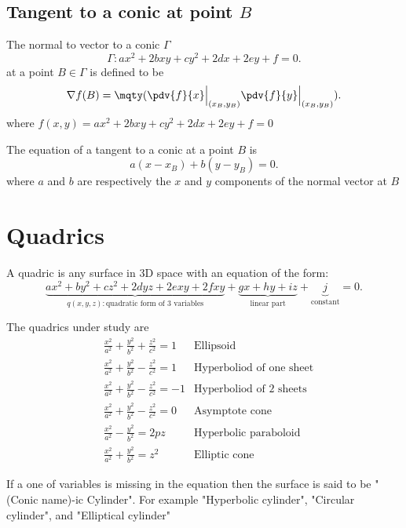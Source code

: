 \subsection{Tangent to a conic at point $B$ }
\begin{theorem}
	The normal to vector to a conic $\Gamma$
	\[
		\Gamma: ax^2+2bxy+cy^2+2dx+2ey+f=0
		.\]
	at a point $B\in\Gamma$ is defined to be
	\[
		\nabla  f(B) = \mqty(\pdv{f}{x} \Big|_{(x_B,y_B)}\\\pdv{f}{y} \Big|_{(x_B,y_B)})
		.\]
	where $f(x,y)=ax^2+2bxy+cy^2+2dx+2ey+f=0
	$
\end{theorem}

The equation of a tangent to a conic at a point $B$ is
\[
	a(x-x_B)+b(y-y_B)=0
	.\]
where $a$ and $b$ are respectively the $x$ and $y$ components of the normal vector at $B$


\section{Quadrics}

\begin{definition}
	A quadric is any surface in 3D space with an equation of the form:
	\[
		\underbrace{ax^2+by^2+cz^2+2dyz+2exy+2fxy}_{q(x,y,z):\text{quadratic form of 3 variables}}+\underbrace{gx+hy+iz}_{\text{linear part}}+\underbrace{j}_{\text{constant}}=0
		.\]
\end{definition}
The quadrics under study are
\begin{align*}
	 & \frac{x^2}{a^2}+\frac{y^2}{b^2}+\frac{z^2}{c^2}=1   & \text{Ellipsoid}                \\
	 & \frac{x^2}{a^2}+\frac{y^2}{b^2}-\frac{z^2}{c^2}=1   & \text{Hyperboliod of one sheet} \\
	 & \frac{x^2}{a^2} +\frac{y^2}{b^2}-\frac{z^2}{c^2}=-1 & \text{Hyperboliod of 2 sheets}  \\
	 & \frac{x^2}{a^2}+\frac{y^2}{b^2}-\frac{z^2}{c^2}=0   & \text{Asymptote cone}           \\
	 & \frac{x^2}{a^2}-\frac{y^2}{b^2}=2pz                 & \text{Hyperbolic paraboloid}    \\
	 & \frac{x^2}{a^2}+\frac{y^2}{b^2}=z^2                 & \text{Elliptic cone}
\end{align*}

If a one of variables is missing in the equation then the surface is said to be "(Conic name)-ic Cylinder". For example "Hyperbolic cylinder", "Circular cylinder", and "Elliptical cylinder"
